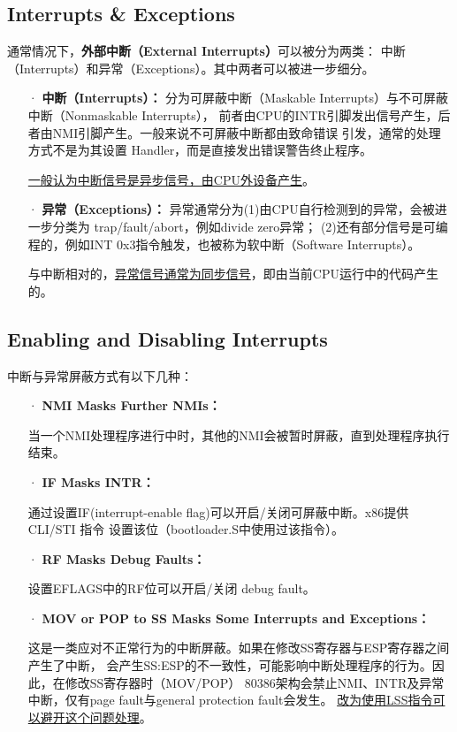 \documentclass[12pt, letterpaper]{report}
\begin{document}
\subsection{\large Interrupts \& Exceptions}
通常情况下，\textbf{外部中断（External Interrupts）}可以被分为两类：
中断（Interrupts）和异常（Exceptions）。其中两者可以被进一步细分。

\begin{itemize}
    \item[·]\textbf{中断（Interrupts）：}
    分为可屏蔽中断（Maskable Interrupts）与不可屏蔽中断（Nonmaskable Interrupts），
    前者由CPU的INTR引脚发出信号产生，后者由NMI引脚产生。一般来说不可屏蔽中断都由致命错误
    引发，通常的处理方式不是为其设置 Handler，而是直接发出错误警告终止程序。\par 
    \underline{一般认为中断信号是异步信号，由CPU外设备产生}。
    \item[·]\textbf{异常（Exceptions）：}
    异常通常分为(1)由CPU自行检测到的异常，会被进一步分类为 trap/fault/abort，例如divide zero异常；
    (2)还有部分信号是可编程的，例如INT 0x3指令触发，也被称为软中断（Software Interrupts）。\par
    与中断相对的，\underline{异常信号通常为同步信号}，即由当前CPU运行中的代码产生的。
\end{itemize}

\subsection{\large Enabling and Disabling Interrupts}
中断与异常屏蔽方式有以下几种：
\begin{itemize}
    \item[·]\textbf{NMI Masks Further NMIs：}\par 
    当一个NMI处理程序进行中时，其他的NMI会被暂时屏蔽，直到处理程序执行结束。
    \item[·]\textbf{IF Masks INTR：} \par 
    通过设置IF(interrupt-enable flag)可以开启/关闭可屏蔽中断。x86提供 CLI/STI 指令
    设置该位（bootloader.S中使用过该指令）。
    \item[·]\textbf{RF Masks Debug Faults：} \par 
    设置EFLAGS中的RF位可以开启/关闭 debug fault。
    \item[·]\textbf{MOV or POP to SS Masks Some Interrupts and Exceptions：} \par 
    这是一类应对不正常行为的中断屏蔽。如果在修改SS寄存器与ESP寄存器之间产生了中断，
    会产生SS:ESP的不一致性，可能影响中断处理程序的行为。因此，在修改SS寄存器时（MOV/POP）
    80386架构会禁止NMI、INTR及异常中断，仅有page fault与general protection fault会发生。
    \underline{改为使用LSS指令可以避开这个问题处理}。
\end{itemize}
\end{document}
